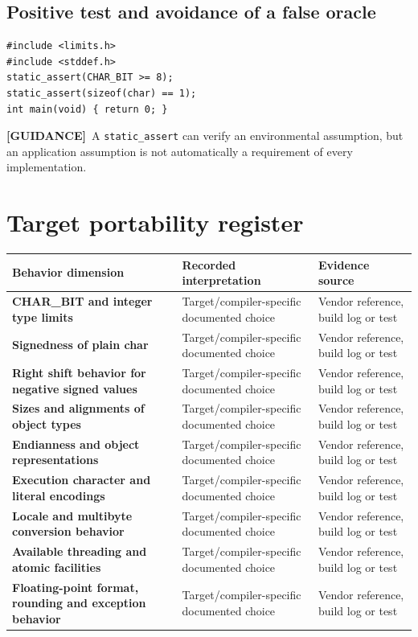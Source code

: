 \documentclass[10pt,letterpaper,oneside]{report}
\newcommand{\guidance}{\textbf{[GUIDANCE]}}
\begin{document}
\section{Positive test and avoidance of a false oracle}
\begin{lstlisting}
#include <limits.h>
#include <stddef.h>
static_assert(CHAR_BIT >= 8);
static_assert(sizeof(char) == 1);
int main(void) { return 0; }
\end{lstlisting}
\guidance\ A \texttt{static\_assert} can verify an environmental assumption, but an application assumption is not automatically a requirement of every implementation.
\chapter{Target portability register}
\small\begin{longtable}{p{.34\linewidth}p{.30\linewidth}p{.28\linewidth}}\toprule Behavior dimension & Recorded interpretation & Evidence source\\\midrule\endhead
\textbf{CHAR\_BIT and integer type limits} & Target/compiler-specific documented choice & Vendor reference, build log or test\\\hline
\textbf{Signedness of plain char} & Target/compiler-specific documented choice & Vendor reference, build log or test\\\hline
\textbf{Right shift behavior for negative signed values} & Target/compiler-specific documented choice & Vendor reference, build log or test\\\hline
\textbf{Sizes and alignments of object types} & Target/compiler-specific documented choice & Vendor reference, build log or test\\\hline
\textbf{Endianness and object representations} & Target/compiler-specific documented choice & Vendor reference, build log or test\\\hline
\textbf{Execution character and literal encodings} & Target/compiler-specific documented choice & Vendor reference, build log or test\\\hline
\textbf{Locale and multibyte conversion behavior} & Target/compiler-specific documented choice & Vendor reference, build log or test\\\hline
\textbf{Available threading and atomic facilities} & Target/compiler-specific documented choice & Vendor reference, build log or test\\\hline
\textbf{Floating-point format, rounding and exception behavior} & Target/compiler-specific documented choice & Vendor reference, build log or test\\\hline

\end{longtable}
\end{document}
